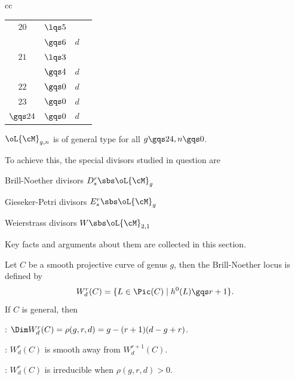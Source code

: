 \documentclass[a4paper, twoside]{article}
\begin{document}
\begin{table}[H]
\begin{tabular}{cc}
\begin{tabular}[t]{cccc}
		  	\hline
			$20$& $\lqs5$ & \red{NK} & \\
				& $\gqs6$ & $d$ & \cite{Farkas2009} \\
		  	\hline
		  	$21$& $\lqs3$ & \red{NK} & \\
				& $\gqs4$ & $d$ & \cite{Farkas2009} \\
		  	\hline
			$22$& $\gqs0$ & $d$ & \cite{FJP2020} \\
		  	$23$& $\gqs0$ & $d$ & \cite{FJP2020} \\
		  	\hline
		  	$\gqs24$& $\gqs0$ & $d$ & \cite{EH1987Kodaira} \\
		  	\bottomrule
		\end{tabular}
	\end{tabular}
\end{table}



\begin{thm}
	$\oL{\cM}_{g,n}$ is of general type for all $g\gqs24,n\gqs0$.
\end{thm}

\begin{rmk}
	To achieve this, the special divisors studied in question are
	\begin{enr}
		\item Brill-Noether divisors $D_{s}^{r}\sbs\oL{\cM}_{g}$
		\item Gieseker-Petri divisors $E_{s}^{r}\sbs\oL{\cM}_{g}$
		\item Weierstrass divisors $W\sbs\oL{\cM}_{2,1}$
	\end{enr}
	Key facts and arguments about them are collected in this section.
\end{rmk}


\begin{thm}
	Let $C$ be a smooth projective curve of genus $g$, then the Brill-Noether locus is defined by
	\[
		W_{d}^{r}(C)=\{L\in\Pic(C)\mid h^{0}(L)\gqs r+1\}.
	\]
	If $C$ is general, then
	\begin{enr}[label=(\arabic*)]
		\item \cite{GH1980}: $\Dim W_{d}^{r}(C)=\rho(g,r,d)=g-(r+1)(d-g+r)$.
		\item \cite{Gieseker1982Petri}: $W_{d}^{r}(C)$ is smooth away from $W_{d}^{r+1}(C)$.
		\item \cite{FL1981}: $W_{d}^{r}(C)$ is irreducible when $\rho(g,r,d)>0$.
	\end{enr}
\end{thm}
\end{document}
